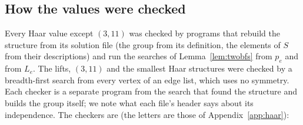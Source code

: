 \documentclass[11pt]{amsart}
\theoremstyle{definition}
\theoremstyle{remark}
\begin{document}
\subsection{How the values were checked}\label{ssec:haarchecks}

Every Haar value except $(3,11)$ was checked by programs that rebuild the structure from its solution file (the group from its definition, the elements of $S$ from their descriptions) and run the searches of Lemma~\ref{lem:twobfs} from $p_e$ and from $L_e$. The lifts, $(3,11)$ and the smallest Haar structures were checked by a breadth-first search from every vertex of an edge list, which uses no symmetry. Each checker is a separate program from the search that found the structure and builds the group itself; we note what each file's header says about its independence. The checkers are (the letters are those of Appendix~\ref{app:haar}):
\end{document}

